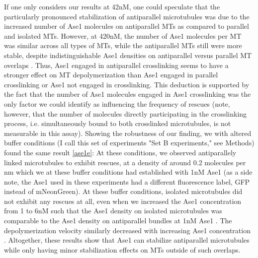 If one only considers our results at 42nM, one could speculate that the particularly pronounced stabilization of antiparallel microtubules was due to the increased number of Ase1 molecules on antiparallel MTs as compared to parallel and isolated MTs. However, at 420nM, the number of Ase1 molecules per MT was similar across all types of MTs, while the antiparallel MTs still were more stable, despite indistinguishable Ase1 densities on antiparallel versus parallel MT overlaps . Thus, Ase1 engaged in antiparallel crosslinking seems to have a stronger effect on MT depolymerization than Ase1 engaged in parallel crosslinking or Ase1 not engaged in crosslinking. This deduction is supported by the fact that the number of Ase1 molecules engaged in Ase1 crosslinking was the only factor we could identify as influencing the frequency of rescues (note, however, that the number of molecules directly participating in the crosslinking process, i.e. simultaneously bound to both crosslinked microtubules, is not measurable in this assay). Showing the robustness of our finding, we with altered buffer conditions (I call this set of experiments "Set B experiments," see Methods) found the same result \autoref{ase1e}: At these conditions, we observed antiparallely linked microtubules to exhibit rescues, at a density of around 0.2 molecules per nm which we at these buffer conditions had established with 1nM Ase1  (as a side note, the Ase1 used in these experiments had a different fluorescence label, GFP instead of mNeonGreen). At these buffer conditions, isolated microtubules did not exhibit any rescues at all, even when we increased the Ase1 concentration from 1 to 6nM such that the Ase1 density on isolated microtubules was comparable to the Ase1 density on antiparallel bundles at 1nM Ase1 . The depolymerization velocity similarly decreased with increasing Ase1 concentration . Altogether, these results show that Ase1 can stabilize antiparallel microtubules while only having minor stabilization effects on MTs outside of such overlaps.

